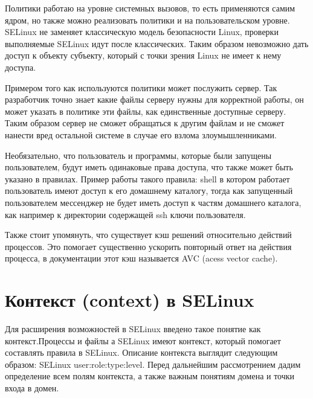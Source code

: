 \documentclass{article}
\begin{document}
Политики работаю на уровне системных вызовов, то есть применяются самим ядром, но также можно реализовать политики и на пользовательском уровне. SELinux не заменяет классическую модель безопасности Linux, проверки выполняемые SELinux идут после классических. Таким образом невозможно дать доступ к объекту субъекту, который с точки зрения Linux не имеет к нему доступа.

Примером того как используются политики может послужить сервер. Так разработчик точно знает какие файлы серверу нужны для корректной работы, он может указать в политике эти файлы, как единственные доступные серверу. Таким образом сервер не сможет обращаться к другим файлам и не сможет нанести вред остальной системе в случае его взлома злоумышленниками.

Необязательно, что пользователь и программы, которые были запущены пользователем, будут иметь одинаковые права доступа, что также может быть указано в правилах. Пример работы такого правила: shell в котором работает пользователь имеют доступ к его домашнему каталогу, тогда как запущенный пользователем мессенджер не будет иметь доступ к частям домашнего каталога, как например к директории содержащей ssh ключи пользователя.

Также стоит упомянуть, что существует кэш решений относительно действий процессов. Это помогает существенно ускорить повторный ответ на действия процесса, в документации этот кэш называется AVC (acess vector cache).


\section{Контекст (context) в SELinux}

Для расширения возможностей в SELinux введено такое понятие как контекст.Процессы и файлы а SELinux имеют контекст, который помогает составлять правила в SELinux. Описание контекста выглядит следующим образом: SELinux user:role:type:level. Перед дальнейшим рассмотрением дадим определение всем полям контекста, а также важным понятиям домена и точки входа в домен.
\end{document}
